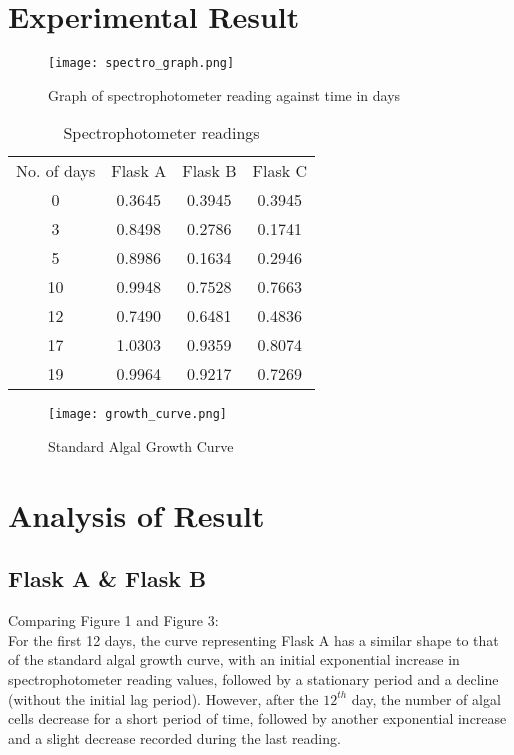 \documentclass[12pt,a4paper]{IEEEtran}
\begin{document}
    \section{Experimental Result}
    \begin{figure}[H]
    	\begin{center}
    		\texttt{[image: spectro\_graph.png]}
    		\caption{Graph of spectrophotometer reading against time in days}
    		\label{fig:spectrograph}
    	\end{center}
    \end{figure} \vspace{-0.2in}
	\begin{table}[H]
		\centering
		\caption{Spectrophotometer readings}
		\label{tab:spectrotable}
		\small
		\begin{tabular}{|c|c|c|c|}
			No. of days & Flask A & Flask B & Flask C \\
			0           & 0.3645  & 0.3945  & 0.3945  \\
			3           & 0.8498  & 0.2786  & 0.1741  \\
			5           & 0.8986  & 0.1634  & 0.2946  \\
			10          & 0.9948  & 0.7528  & 0.7663  \\
			12          & 0.7490  & 0.6481  & 0.4836  \\
			17          & 1.0303  & 0.9359  & 0.8074  \\
			19          & 0.9964  & 0.9217  & 0.7269          
		\end{tabular}
		\normalsize
	\end{table}
	\begin{figure}[H]
		\begin{center}
			\texttt{[image: growth\_curve.png]}
			\caption{Standard Algal Growth Curve}
			\label{growthcurve}
		\end{center}
	\end{figure}
    \section{Analysis of Result}
    \subsection{Flask A \& Flask B}
    Comparing Figure 1 and Figure 3: \\
    
    For the first 12 days, the curve representing Flask A has a similar shape to that of the standard algal growth curve, with an initial exponential increase in spectrophotometer reading values, followed by a stationary period and a decline (without the initial lag period). However, after the $12^{th}$ day, the number of algal cells decrease for a short period of time, followed by another exponential increase and a slight decrease recorded during the last reading.\\
    
\end{document}

